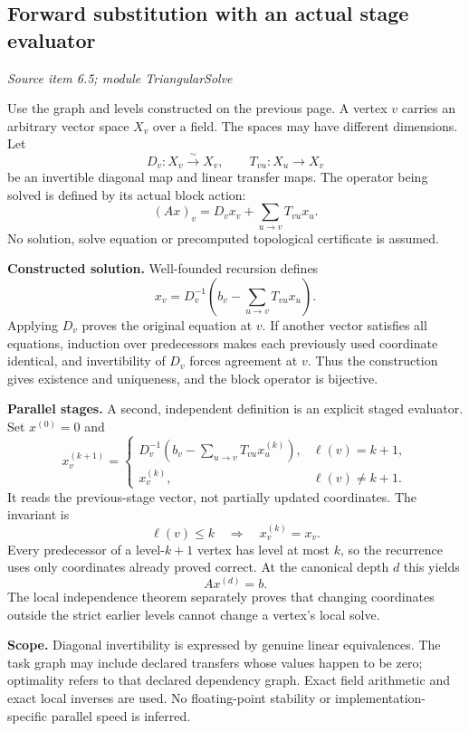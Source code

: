 \documentclass[11pt,letterpaper]{article}
\theoremstyle{definition}
\theoremstyle{remark}
\begin{document}
\subsection{Forward substitution with an actual stage evaluator}\label{supp5:subsection:002}\textit{Source item 6.5; module TriangularSolve}\par
Use the graph and levels constructed on the previous page. A vertex $v$ carries an arbitrary vector space $X_v$ over a field. The spaces may have different dimensions. Let
\[
D_v:X_v\overset{\sim}{\longrightarrow}X_v,
\qquad T_{vu}:X_u\longrightarrow X_v
\]
be an invertible diagonal map and linear transfer maps. The operator being solved is defined by its actual block action:
\[
(Ax)_v=D_vx_v+\sum_{u\to v}T_{vu}x_u.
\]
No solution, solve equation or precomputed topological certificate is assumed.

\textbf{Constructed solution.} Well-founded recursion defines
\[
\boxed{x_v=D_v^{-1}\!\left(b_v-\sum_{u\to v}T_{vu}x_u\right).}
\]
Applying $D_v$ proves the original equation at $v$. If another vector satisfies all equations, induction over predecessors makes each previously used coordinate identical, and invertibility of $D_v$ forces agreement at $v$. Thus the construction gives existence and uniqueness, and the block operator is bijective.

\textbf{Parallel stages.} A second, independent definition is an explicit staged evaluator. Set $x^{(0)}=0$ and
\[
x^{(k+1)}_v=
\begin{cases}
D_v^{-1}\!\left(b_v-\displaystyle\sum_{u\to v}T_{vu}x^{(k)}_u\right),
  &\ell(v)=k+1,\\[5pt]
x^{(k)}_v,&\ell(v)\ne k+1.
\end{cases}
\]
It reads the previous-stage vector, not partially updated coordinates. The invariant is
\[
\ell(v)\leq k\quad\Longrightarrow\quad x^{(k)}_v=x_v.
\]
Every predecessor of a level-$k+1$ vertex has level at most $k$, so the recurrence uses only coordinates already proved correct. At the canonical depth $d$ this yields
\[
\boxed{Ax^{(d)}=b.}
\]
The local independence theorem separately proves that changing coordinates outside the strict earlier levels cannot change a vertex's local solve.

\textbf{Scope.} Diagonal invertibility is expressed by genuine linear equivalences. The task graph may include declared transfers whose values happen to be zero; optimality refers to that declared dependency graph. Exact field arithmetic and exact local inverses are used. No floating-point stability or implementation-specific parallel speed is inferred.
\end{document}
